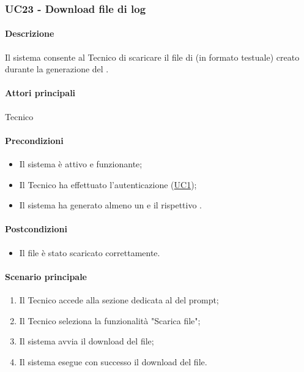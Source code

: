 \subsubsection{UC23 - Download file di log}\label{UC23}
\paragraph*{Descrizione}
Il sistema consente al Tecnico di scaricare il file di  (in formato testuale) creato durante la generazione del .

\paragraph*{Attori principali}
Tecnico

\paragraph*{Precondizioni}
\begin{itemize}
  \item Il sistema è attivo e funzionante;
  \item Il Tecnico ha effettuato l'autenticazione (\hyperref[UC1]{UC1});
  \item Il sistema ha generato almeno un  e il rispettivo .
\end{itemize}

\paragraph*{Postcondizioni}
\begin{itemize}
  \item Il file è stato scaricato correttamente.
\end{itemize}

\paragraph*{Scenario principale}
\begin{enumerate}
  \item Il Tecnico accede alla sezione dedicata al  del prompt;
  \item Il Tecnico seleziona la funzionalità "Scarica file";
  \item Il sistema avvia il download del file;
  \item Il sistema esegue con successo il download del file.
\end{enumerate}


